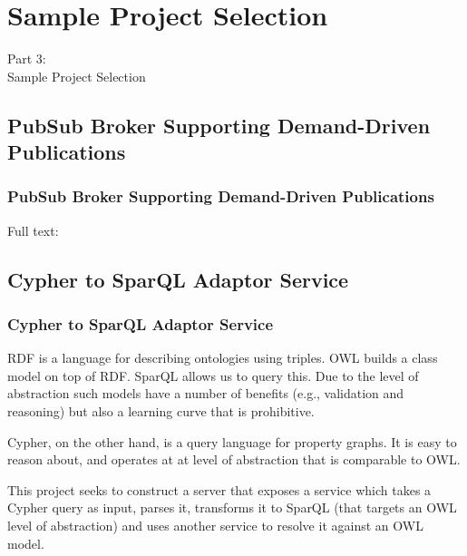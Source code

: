 \section{Sample Project Selection}
\begin{frame}
    \vspace{25mm}
    \begin{center}
        \Huge{Part 3:\\Sample Project Selection}
    \end{center}
\end{frame}

\subsection{PubSub Broker Supporting Demand-Driven Publications}
\begin{frame}
    \frametitle{PubSub Broker Supporting Demand-Driven Publications}
    \vspace{0mm}
    

    \vspace{3mm}
    Full text: 
\end{frame}

\subsection{Cypher to SparQL Adaptor Service}
\begin{frame}
    \frametitle{Cypher to SparQL Adaptor Service}
    \vspace{0mm}
    RDF is a language for describing ontologies using triples. OWL builds a class model on top of RDF. SparQL allows us to query this. Due to the level of abstraction such models have a number of benefits (e.g., validation and reasoning) but also a learning curve that is prohibitive.
    
    \vspace{3mm}
    Cypher, on the other hand, is a query language for property graphs. It is easy to reason about, and operates at at level of abstraction that is comparable to OWL.
    
    \vspace{3mm}
    This project seeks to construct a server that exposes a service which takes a Cypher query as input, parses it, transforms it to SparQL (that targets an OWL level of abstraction) and uses another service to resolve it against an OWL model.
\end{frame}

